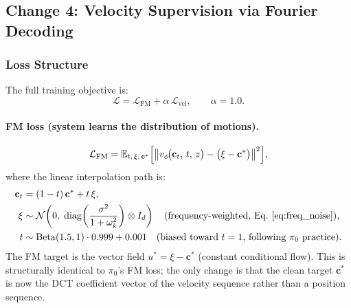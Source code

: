 \documentclass[11pt]{article}
\theoremstyle{plain}
\theoremstyle{definition}
\newcommand{\E}{\mathbb{E}}
\newcommand{\cL}{\mathcal{L}}
\newcommand{\cN}{\mathcal{N}}
\newcommand{\norm}[1]{\left\lVert#1\right\rVert}
\newcommand{\vnet}{v_\phi}
\newcommand{\tdiff}{t}
\newcommand{\bz}{z}
\newcommand{\ccoeff}{\mathbf{c}}
\newcommand{\cclean}{\ccoeff^*}
\newcommand{\cnoisy}{\ccoeff_\tdiff}
\begin{document}
\subsection{Change 4: Velocity Supervision via Fourier Decoding}
\label{sec:vel_supervision}

\subsubsection{Loss Structure}

The full training objective is:
\begin{equation}
  \label{eq:total_loss}
  \cL = \cL_{\mathrm{FM}} + \alpha\,\cL_{\mathrm{vel}},
  \qquad \alpha = 1.0.
\end{equation}

\paragraph{FM loss (system learns the distribution of motions).}
\begin{equation}
  \label{eq:fm_loss}
  \cL_{\mathrm{FM}} = \E_{\tdiff,\,\xi,\,\cclean}
  \Bigl[\norm{\vnet\!\bigl(\cnoisy,\,\tdiff,\,\bz\bigr)
    - \bigl(\xi - \cclean\bigr)}^2\Bigr],
\end{equation}
where the linear interpolation path is:
\begin{align}
  \cnoisy &= (1-\tdiff)\,\cclean + \tdiff\,\xi, \\
  \xi &\sim \cN\!\left(0,\;\mathrm{diag}\!\left(\frac{\sigma^2}{1+\omega_k^2}\right)
    \otimes I_d\right) \quad \text{(frequency-weighted, Eq.~\ref{eq:freq_noise})}, \\
  \tdiff &\sim \mathrm{Beta}(1.5, 1) \cdot 0.999 + 0.001
    \quad \text{(biased toward $t=1$, following $\pi_0$ practice)}.
\end{align}
The FM target is the vector field $u^* = \xi - \cclean$ (constant conditional flow).
This is structurally identical to $\pi_0$'s FM loss; the only change is
that the clean target $\cclean$ is now the DCT coefficient vector of
the velocity sequence rather than a position sequence.
\end{document}
